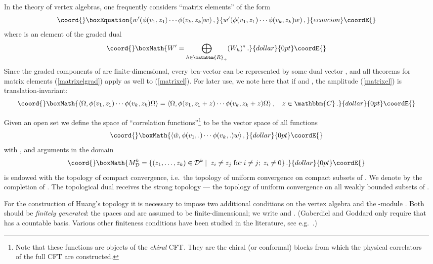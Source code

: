\documentclass[a4paper,12pt,twoside]{article}
\renewcommand{\b}{\langle}
\renewcommand{\k}{\rangle}
\renewcommand{\c}[1]{{\cal #1}}
\providecommand{\bN}{\mathbbm{N}}
\providecommand{\bC}{\mathbbm{C}}
\providecommand{\bR}{\mathbbm{R}}
\providecommand{\eq}[1]{(\ref{#1})}
\providecommand{\D}{\c{D}}
\providecommand{\Fd}{F^{\D}_k}
\providecommand{\hF}{\tilde{F}}
\providecommand{\hFd}{\hF^{\D}_k}
\providecommand{\Fdd}{F^{\D{\textstyle *}}_k}
\providecommand{\Md}{M^k_{\D}}
\providecommand{\wt}{\tilde{w}}
\begin{document}
In the theory of vertex algebras, one frequently considers
``matrix elements'' of the form
\begin{equation}\coord{}\boxEquation{
\label{matrixelgrad}
w'(\phi(v_1,z_1)\cdots\phi(v_k,z_k)w)\,,
}{
w'(\phi(v_1,z_1)\cdots\phi(v_k,z_k)w)\,,
}{ecuacion}\coordE{}\end{equation}
where \coordHE{} is an element of the graded dual
$$\coord{}\boxMath{W' = \bigoplus_{h\in\bR_+} (W_h)^*\,.}{dollar}{0pt}\coordE{}$$
Since the graded components of \coordHE{} are finite-dimensional,
every bra-vector \myHighlight{$\b\wt\hspace{0.3mm}|$}\coordHE{} can be represented
by some dual vector \coordHE{}, and all theorems
for matrix elements \eq{matrixelgrad} apply as well to \eq{matrixel}.
For later use, we note here that if \coordHE{} and \myHighlight{$w = \wt = \Omega$}\coordHE{},
the amplitude \eq{matrixel} is translation-invariant:
$$\coord{}\boxMath{\b\Omega,\phi(v_1,z_1)\cdots\phi(v_k,z_k)\Omega\k
= \b\Omega,\phi(v_1,z_1+z)\cdots\phi(v_k,z_k+z)\Omega\k\,,\quad z\in\bC\,.}{dollar}{0pt}\coordE{}$$

Given an open set \myHighlight{$\D\subset\bC$}\coordHE{} we define the space
of ``correlation functions''\footnote{Note that these functions are
objects of the {\it chiral} CFT. They are the chiral (or conformal)
blocks from which the
physical correlators of the full CFT are constructed.}
\myHighlight{$\hFd$}\coordHE{}  \myHighlight{$(k\in\bN)$}\coordHE{} to be the vector space of all functions
$$\coord{}\boxMath{\b \wt,\phi(v_1,.)\cdots\phi(v_k,.)w\k\,,}{dollar}{0pt}\coordE{}$$
with \coordHE{}, \myHighlight{$w,\wt\in W$}\coordHE{} and arguments \coordHE{}
in the domain
$$\coord{}\boxMath{\Md = \{(z_1,\ldots,z_k)\in \D^k\;|\; \;z_i\ne
z_j\;\mbox{for}\; i\ne j;\; z_i \neq 0\}\,.}{dollar}{0pt}\coordE{}$$  \myHighlight{$\hFd$}\coordHE{} is endowed with the topology of compact convergence,
i.e.\ the topology of uniform convergence on compact subsets of
\myHighlight{$\Md$}\coordHE{}. We denote by \myHighlight{$\Fd$}\coordHE{} the completion of \myHighlight{$\hFd$}\coordHE{}.
The topological dual \myHighlight{$\Fdd$}\coordHE{} receives the strong topology --- the topology
of uniform convergence on all weakly bounded subsets of \myHighlight{$\Fd$}\coordHE{}.

For the construction of Huang's topology it is necessary to impose
two additional conditions on the vertex algebra \coordHE{} and the
\coordHE{}-module \coordHE{}. Both should be {\it finitely generated}:
the spaces \coordHE{} and \coordHE{} are assumed to be finite-dimensional; we write
\coordHE{} and \coordHE{}. (Gaberdiel and Goddard only require that \coordHE{}
has a countable basis. Various other finiteness conditions have been studied
in the literature, see e.g.\ \cite{Nagatomo}.)
\end{document}

